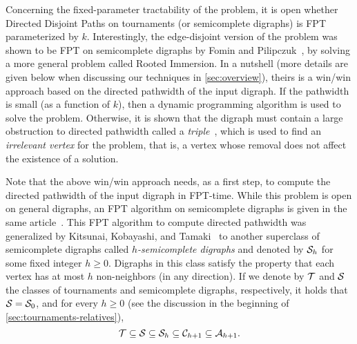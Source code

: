 \documentclass[a4paper,UKenglish,cleveref, autoref, thm-restate]{lipics-v2021}
\renewcommand{\FPT}{{\sf FPT}\xspace}
\begin{document}
Concerning the fixed-parameter tractability of the problem, it is open whether  {\sc
Directed Disjoint Paths} on tournaments (or semicomplete digraphs) is \FPT
parameterized by $k$. Interestingly, the edge-disjoint version of the problem was shown
to be \FPT on semicomplete digraphs by Fomin and Pilipczuk~\cite{FominP19}, by solving
a more general problem called {\sc Rooted Immersion}. In a nutshell (more details are
given below when discussing our techniques in \autoref{sec:overview}),
theirs is a win/win approach based on the directed pathwidth of the input
digraph. If the pathwidth is small (as a function of $k$), then a dynamic programming
algorithm is used to solve the problem. Otherwise, it is shown that the digraph must
contain a large obstruction to directed pathwidth called a \emph{triple}~\cite{FradkinS13}, which is used to
find an \emph{irrelevant vertex} for the problem, that is, a vertex whose removal
does not affect the existence of a solution.

Note that the above win/win approach needs, as a first step, to compute the directed pathwidth
of the input digraph in \FPT-time. While this problem is open on general digraphs, an
\FPT algorithm on semicomplete digraphs is given in the same article~\cite{FominP19}.
This \FPT algorithm to compute directed pathwidth was generalized by Kitsunai, Kobayashi, and
Tamaki~\cite{KitsunaiKT15} to another superclass of semicomplete digraphs called
\emph{$h$-semicomplete digraphs} and denoted by ${\cal S}_h$ for some fixed integer
$h \geq 0$. Digraphs in this class satisfy the property that each vertex has at most $h$
non-neighbors (in any direction). If we denote by ${\cal T}$ and ${\cal S}$ the classes of tournaments and semicomplete
digraphs, respectively, it holds that ${\cal S} = {\cal S}_0$, and for every $h \geq
0$ (see the discussion in the beginning of \autoref{sec:tournaments-relatives}),
\begin{equation}\label{eq:containment-classes}
  {\cal T} \subseteq {\cal S}  \subseteq {\cal S}_h \subseteq  {\cal C}_{h+1}
  \subseteq {\cal A}_{h+1}.
\end{equation}
\end{document}
